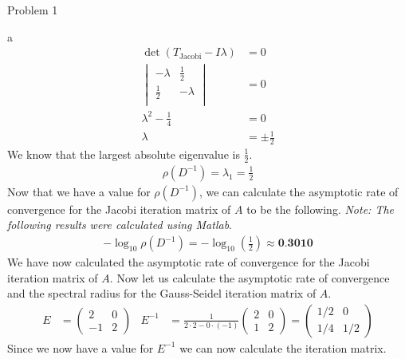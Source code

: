 \begin{section}{Problem 1}
\begin{solution}{a}
        \begin{align*}
            \det \left( T_\text{Jacobi} - I \lambda \right) &= 0 \\
            \begin{vmatrix}
                -\lambda & \frac{1}{2} \\
                \frac{1}{2} & -\lambda \\
            \end{vmatrix} &= 0 \\
            \lambda^2 - \frac{1}{4} &= 0 \\
            \lambda &= \pm \frac{1}{2}
        \end{align*}
        We know that the largest absolute eigenvalue is $\frac{1}{2}$.
        \begin{align*}
            \rho \left( D^{-1} \right) = \lambda_1 = \frac{1}{2}
        \end{align*}
        Now that we have a value for $\rho \left( D^{-1} \right)$, we can calculate the asymptotic rate of convergence for the Jacobi iteration matrix of $A$ to be the following. \textit{Note: The following results were calculated using Matlab}.
        \begin{align*}
            - \log_{10} \rho \left( D^{-1} \right) = - \log_{10} \left( \frac{1}{2} \right) \approx \textbf{0.3010}
        \end{align*}
        We have now calculated the asymptotic rate of convergence for the Jacobi iteration matrix of $A$. Now let us calculate the asymptotic rate of convergence and the spectral radius for the Gauss-Seidel iteration matrix of $A$.
        \begin{align*}
            E &= \begin{pmatrix}
                2 & 0 \\
                -1 & 2
            \end{pmatrix} & 
            E^{-1} &= \frac{1}{2 \cdot 2 - 0 \cdot (-1)} \begin{pmatrix}
                2 & 0 \\
                1 & 2
            \end{pmatrix} = \begin{pmatrix}
                1/2 & 0 \\
                1/4 & 1/2
            \end{pmatrix}
        \end{align*}
        Since we now have a value for $E^{-1}$ we can now calculate the iteration matrix.

\end{solution}
\end{section}
